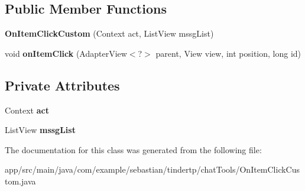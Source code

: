 \subsection*{Public Member Functions}
\begin{DoxyCompactItemize}
\item 
{\bfseries On\+Item\+Click\+Custom} (Context act, List\+View mssg\+List)\hypertarget{classcom_1_1example_1_1sebastian_1_1tindertp_1_1chatTools_1_1OnItemClickCustom_a862a81b02a27e2455c849ba0a1e28fa2}{}\label{classcom_1_1example_1_1sebastian_1_1tindertp_1_1chatTools_1_1OnItemClickCustom_a862a81b02a27e2455c849ba0a1e28fa2}

\item 
void {\bfseries on\+Item\+Click} (Adapter\+View$<$?$>$ parent, View view, int position, long id)\hypertarget{classcom_1_1example_1_1sebastian_1_1tindertp_1_1chatTools_1_1OnItemClickCustom_ae7f4087b859eac7895a8a91a366611ab}{}\label{classcom_1_1example_1_1sebastian_1_1tindertp_1_1chatTools_1_1OnItemClickCustom_ae7f4087b859eac7895a8a91a366611ab}

\end{DoxyCompactItemize}
\subsection*{Private Attributes}
\begin{DoxyCompactItemize}
\item 
Context {\bfseries act}\hypertarget{classcom_1_1example_1_1sebastian_1_1tindertp_1_1chatTools_1_1OnItemClickCustom_a654dc53802fe629b9c939977e825390a}{}\label{classcom_1_1example_1_1sebastian_1_1tindertp_1_1chatTools_1_1OnItemClickCustom_a654dc53802fe629b9c939977e825390a}

\item 
List\+View {\bfseries mssg\+List}\hypertarget{classcom_1_1example_1_1sebastian_1_1tindertp_1_1chatTools_1_1OnItemClickCustom_ae3fe5ee064e2336163d52efb6838a043}{}\label{classcom_1_1example_1_1sebastian_1_1tindertp_1_1chatTools_1_1OnItemClickCustom_ae3fe5ee064e2336163d52efb6838a043}

\end{DoxyCompactItemize}


The documentation for this class was generated from the following file\+:\begin{DoxyCompactItemize}
\item 
app/src/main/java/com/example/sebastian/tindertp/chat\+Tools/On\+Item\+Click\+Custom.\+java\end{DoxyCompactItemize}
